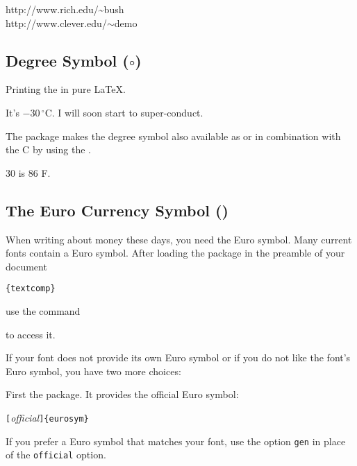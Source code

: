 \begin{example}
http://www.rich.edu/\~{}bush \\
http://www.clever.edu/$\sim$demo
\end{example}  
 
\subsection{Degree Symbol \texorpdfstring{($\circ$)}{}}

Printing the  in pure \LaTeX{}.

\begin{example}
It's $-30\,^{\circ}\mathrm{C}$.
I will soon start to
super-conduct.
\end{example}

The  package makes the degree symbol also available as
 or in combination with the C by using the .

\begin{example}
30 \textcelsius{} is
86 \textdegree{}F.
\end{example}

\subsection{The Euro Currency Symbol \texorpdfstring{(\officialeuro)}{}}

When writing about money these days, you need the Euro symbol. Many current
fonts contain a Euro symbol. After loading the  package in the preamble of your document
\begin{lscommand}
\verb|{textcomp}| 
\end{lscommand}
use the command
\begin{lscommand}
\end{lscommand}
to access it.

If your font does not provide its own Euro symbol or if you do not like the
font's Euro symbol, you have two more choices:

First the  package. It provides the official Euro symbol:
\begin{lscommand}
\verb|[|\emph{official}\verb|]{eurosym}|
\end{lscommand}
If you prefer a Euro symbol that matches your font, use the option
\texttt{gen} in place of the \texttt{official} option.


